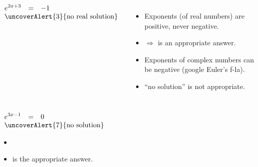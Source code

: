 \begin{frame}

\begin{example}
\begin{columns}
\hfil\hfil $
\begin{array}{rcl} 
\displaystyle e^{2x+3}&=&\displaystyle -1\\
\multicolumn{3}{c}{\uncoverAlert{3}{ \text{no real solution}}}
\end{array}
$
\begin{itemize}
\item<2-> Exponents (of real numbers) are positive, never negative.
\item<3-> $\Rightarrow$  is an appropriate answer.
\item<4-> Exponents of complex numbers can be negative (google Euler's f-la).
\item<5-> ``no solution'' is not appropriate.
\end{itemize}
\end{columns}
\end{example}

\begin{example}
\hfil \hfil $
\begin{array}{rcl} 
\displaystyle e^{3x-1}&=&\displaystyle 0\\
\multicolumn{3}{c}{\uncoverAlert{7}{ \text{no solution}}}
\end{array}
$
\begin{itemize}
\item<6-> 
\item<7->  is the appropriate answer.
\end{itemize}
\end{example}

\end{frame}